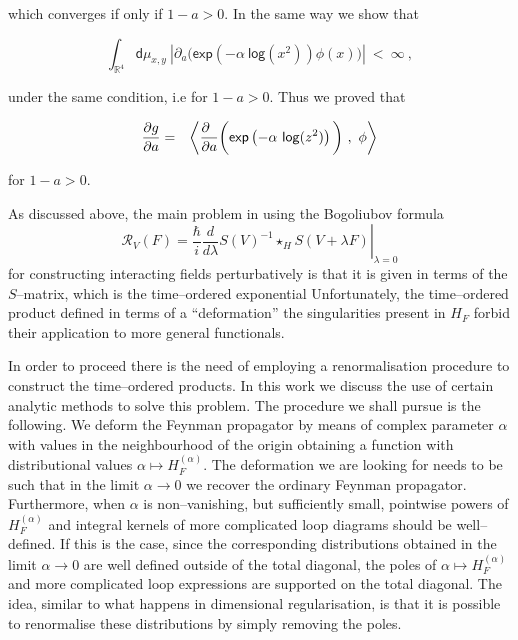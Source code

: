 \documentclass[10pt]{book}
\newcommand{\abs}[1]{\left|#1\right|}
\let\int\int
\theoremstyle{break}
\begin{document}
which converges if only if $1-a > 0$. In the same way we show  that
 
\begin{equation*}
\int_{\mathbb{R}^4} \mathsf{d}\mu_{x,y} \ \abs{\partial_a \bigg(\mathsf{exp}\left(-\alpha \ \mathsf{log}(x^2)\right) \phi(x)\bigg)} \ < \ \infty \ ,
\end{equation*}


under the same condition, i.e for $1-a>0$. Thus we proved that 

\begin{eqnarray*} 
\frac{\partial g}{\partial a} &=& \left\langle \frac{\partial \hfill}{\partial a} \bigg(\mathsf{exp}\left(-\alpha \ \mathsf{log}(z^2)\right)\bigg) \ , \ \phi\right\rangle
\end{eqnarray*}


for $1-a > 0$. 




As discussed above, the main problem in using the Bogoliubov formula %
\[
\mathcal{R}_V(F) = \left. \frac{\hbar}{i}\frac{d}{d\lambda} S(V)^{-1}\star_H S(V+\lambda F) \right|_{\lambda = 0}
\]
for constructing interacting fields perturbatively is that it is given in terms of the $S$--matrix, which is the time--ordered exponential %
Unfortunately, the time--ordered product defined in terms of a ``deformation'' %
the singularities present in $H_F$ forbid their application to more general functionals. 



In order to proceed there is the need of employing a renormalisation procedure to construct the time--ordered products.
In this work we discuss the use of certain analytic methods to solve this problem.
The procedure we shall pursue is the following. 
We deform the Feynman propagator by means of complex parameter $\alpha$ with values in the neighbourhood of the origin obtaining a function with distributional values $\alpha \mapsto H_F^{(\alpha)}$. The deformation we are looking for needs to be such that in the limit $\alpha \to 0$ we recover the ordinary Feynman propagator. Furthermore, when $\alpha$ is non--vanishing, but sufficiently small, pointwise powers of $H^{(\alpha)}_F$ and integral kernels of more complicated loop diagrams should be well--defined. If this is the case, since the corresponding distributions obtained in the limit $\alpha\to0$ are well defined outside of the total diagonal, the poles of $\alpha \mapsto H_F^{(\alpha)}$ and more complicated loop expressions are supported on the total diagonal. 
The idea, similar to what happens in dimensional regularisation, is that it is possible to renormalise these distributions by simply removing the poles. 
\end{document}
